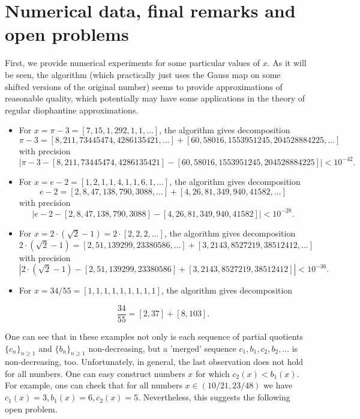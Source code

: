 \documentclass{amsart}
\theoremstyle{definition}
\newcommand{\0}{\mbf 0}%
\begin{document}
\section{Numerical data, final remarks and open problems}\label{sec:remarks}

First, we provide numerical experiments for some particular values of $x$. As it will be seen, the algorithm (which practically just uses the Gauss map on some shifted versions of the original number) seems to provide approximations of reasonable quality, which potentially may have some applications in the theory of regular diophantine approximations. 

\begin{itemize}
    \item For $x=\pi-3=[7, 15, 1, 292, 1, 1,\ldots]$, the algorithm gives decomposition
    $$
\pi-3 =   [8, 211, 73445474, 4286135421,\ldots]+[60, 58016, 1553951245, 204528884225,\ldots]
$$
with precision 
$$
\left|\pi - 3 - [8, 211, 73445474, 4286135421]-[60, 58016, 1553951245, 204528884225]\right|<10^{-42}.
$$

\item For $x=e-2=[1, 2, 1, 1, 4, 1, 1, 6, 1,\ldots]$,  the algorithm gives decomposition
    $$
e-2 = [2, 8, 47, 138, 790, 3088,\ldots] + [4, 26, 81, 349, 940, 41582,\ldots]
    $$
with precision 
$$
|e-2 - [2, 8, 47, 138, 790, 3088] - [4, 26, 81, 349, 940, 41582] | < 10^{-28}.
$$




\item For $x=2\cdot(\sqrt2-1)=2\cdot[2,2,2,\ldots]$, the algorithm gives decomposition
$$
2\cdot(\sqrt2-1) = [ 2, 51, 139299, 23380586,\ldots] + [ 3, 2143, 8527219, 38512412,\ldots]
$$
with precision
$$
| 2\cdot(\sqrt2-1) - [ 2, 51, 139299, 23380586] + [ 3, 2143, 8527219, 38512412] | < 10^{-36}.
$$



\item For $x= 34/55=[1, 1, 1, 1, 1, 1, 1, 1, 1]$, the algorithm gives decomposition

$$
\frac{34}{55} = [2,37]+[8,103].
$$
\end{itemize}

One can see that in these examples not only is each sequence of partial quotients $\{c_n\}_{n\geq1}$ and $\{b_n\}_{n\geq1}$ non-decreasing, but a 'merged' sequence $c_1,b_1,c_2,b_2,\ldots$ is non-decreasing, too. Unfortunately, in general, the last observation does not hold for all numbers. One can easy construct numbers $x$ for which $c_2(x) < b_1(x)$. For example, one can check that for all numbers $x\in(10/21,23/48)$ we have $c_1(x)=3,b_1(x)=6,c_2(x)=5$. Nevertheless, this suggests the following open problem.
\end{document}
